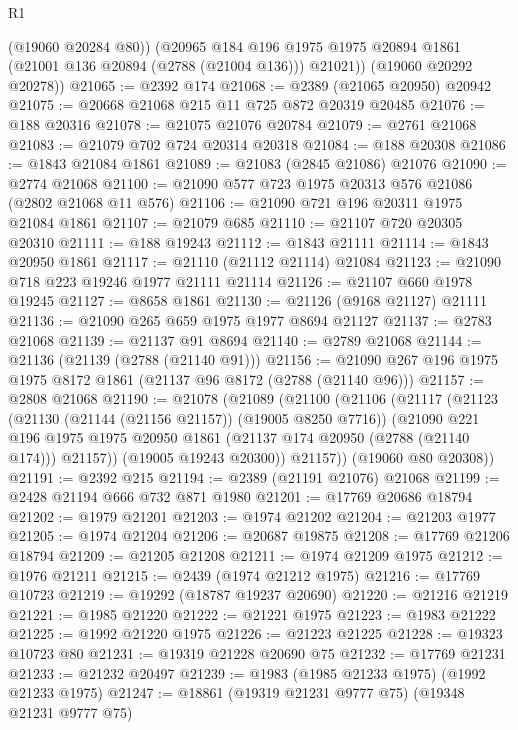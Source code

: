 \begin{lexlean}{R1}
\begin{coremodule}
          (@19060 @20284 @80))
        (@20965
          @184
          @196
          @1975
          @1975
          @20894
          @1861
          (@21001 @136 @20894 (@2788 (@21004 @136)))
          @21021))
      (@19060 @20292 @20278))
@21065 := @2392 @174
@21068 := @2389 (@21065 @20950) @20942
@21075 := @20668 @21068 @215 @11 @725 @872 @20319 @20485
@21076 := @188 @20316
@21078 := @21075 @21076 @20784
@21079 := @2761 @21068
@21083 := @21079 @702 @724 @20314 @20318
@21084 := @188 @20308
@21086 := @1843 @21084 @1861
@21089 := @21083 (@2845 @21086) @21076
@21090 := @2774 @21068
@21100 := @21090 @577 @723 @1975 @20313 @576 @21086 (@2802 @21068 @11 @576)
@21106 := @21090 @721 @196 @20311 @1975 @21084 @1861
@21107 := @21079 @685
@21110 := @21107 @720 @20305 @20310
@21111 := @188 @19243
@21112 := @1843 @21111
@21114 := @1843 @20950 @1861
@21117 := @21110 (@21112 @21114) @21084
@21123 := @21090 @718 @223 @19246 @1977 @21111 @21114
@21126 := @21107 @660 @1978 @19245
@21127 := @8658 @1861
@21130 := @21126 (@9168 @21127) @21111
@21136 := @21090 @265 @659 @1975 @1977 @8694 @21127
@21137 := @2783 @21068
@21139 := @21137 @91 @8694
@21140 := @2789 @21068
@21144 := @21136 (@21139 (@2788 (@21140 @91)))
@21156 := @21090 @267 @196 @1975 @1975 @8172 @1861 (@21137 @96 @8172 (@2788 (@21140 @96)))
@21157 := @2808 @21068
@21190 := @21078
    (@21089
      (@21100
        (@21106
          (@21117
            (@21123
              (@21130 (@21144 (@21156 @21157)) (@19005 @8250 @7716))
              (@21090
                @221
                @196
                @1975
                @1975
                @20950
                @1861
                (@21137 @174 @20950 (@2788 (@21140 @174)))
                @21157))
            (@19005 @19243 @20300))
          @21157))
      (@19060 @80 @20308))
@21191 := @2392 @215
@21194 := @2389 (@21191 @21076) @21068
@21199 := @2428 @21194 @666 @732 @871 @1980
@21201 := @17769 @20686 @18794
@21202 := @1979 @21201
@21203 := @1974 @21202
@21204 := @21203 @1977
@21205 := @1974 @21204
@21206 := @20687 @19875
@21208 := @17769 @21206 @18794
@21209 := @21205 @21208
@21211 := @1974 @21209 @1975
@21212 := @1976 @21211
@21215 := @2439 (@1974 @21212 @1975)
@21216 := @17769 @10723
@21219 := @19292 (@18787 @19237 @20690)
@21220 := @21216 @21219
@21221 := @1985 @21220
@21222 := @21221 @1975
@21223 := @1983 @21222
@21225 := @1992 @21220 @1975
@21226 := @21223 @21225
@21228 := @19323 @10723 @80
@21231 := @19319 @21228 @20690 @75
@21232 := @17769 @21231
@21233 := @21232 @20497
@21239 := @1983 (@1985 @21233 @1975) (@1992 @21233 @1975)
@21247 := @18861 (@19319 @21231 @9777 @75) (@19348 @21231 @9777 @75)

\end{coremodule}
\end{lexlean}
